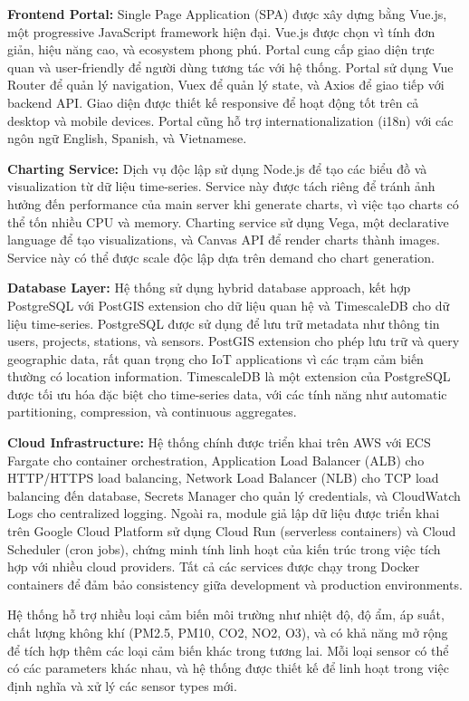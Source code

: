 \textbf{Frontend Portal:} Single Page Application (SPA) được xây dựng bằng Vue.js, một progressive JavaScript framework hiện đại. Vue.js được chọn vì tính đơn giản, hiệu năng cao, và ecosystem phong phú. Portal cung cấp giao diện trực quan và user-friendly để người dùng tương tác với hệ thống. Portal sử dụng Vue Router để quản lý navigation, Vuex để quản lý state, và Axios để giao tiếp với backend API. Giao diện được thiết kế responsive để hoạt động tốt trên cả desktop và mobile devices. Portal cũng hỗ trợ internationalization (i18n) với các ngôn ngữ English, Spanish, và Vietnamese.

\textbf{Charting Service:} Dịch vụ độc lập sử dụng Node.js để tạo các biểu đồ và visualization từ dữ liệu time-series. Service này được tách riêng để tránh ảnh hưởng đến performance của main server khi generate charts, vì việc tạo charts có thể tốn nhiều CPU và memory. Charting service sử dụng Vega, một declarative language để tạo visualizations, và Canvas API để render charts thành images. Service này có thể được scale độc lập dựa trên demand cho chart generation.

\textbf{Database Layer:} Hệ thống sử dụng hybrid database approach, kết hợp PostgreSQL với PostGIS extension cho dữ liệu quan hệ và TimescaleDB cho dữ liệu time-series. PostgreSQL được sử dụng để lưu trữ metadata như thông tin users, projects, stations, và sensors. PostGIS extension cho phép lưu trữ và query geographic data, rất quan trọng cho IoT applications vì các trạm cảm biến thường có location information. TimescaleDB là một extension của PostgreSQL được tối ưu hóa đặc biệt cho time-series data, với các tính năng như automatic partitioning, compression, và continuous aggregates.

\textbf{Cloud Infrastructure:} Hệ thống chính được triển khai trên AWS với ECS Fargate cho container orchestration, Application Load Balancer (ALB) cho HTTP/HTTPS load balancing, Network Load Balancer (NLB) cho TCP load balancing đến database, Secrets Manager cho quản lý credentials, và CloudWatch Logs cho centralized logging. Ngoài ra, module giả lập dữ liệu được triển khai trên Google Cloud Platform sử dụng Cloud Run (serverless containers) và Cloud Scheduler (cron jobs), chứng minh tính linh hoạt của kiến trúc trong việc tích hợp với nhiều cloud providers. Tất cả các services được chạy trong Docker containers để đảm bảo consistency giữa development và production environments.

Hệ thống hỗ trợ nhiều loại cảm biến môi trường như nhiệt độ, độ ẩm, áp suất, chất lượng không khí (PM2.5, PM10, CO2, NO2, O3), và có khả năng mở rộng để tích hợp thêm các loại cảm biến khác trong tương lai. Mỗi loại sensor có thể có các parameters khác nhau, và hệ thống được thiết kế để linh hoạt trong việc định nghĩa và xử lý các sensor types mới.

